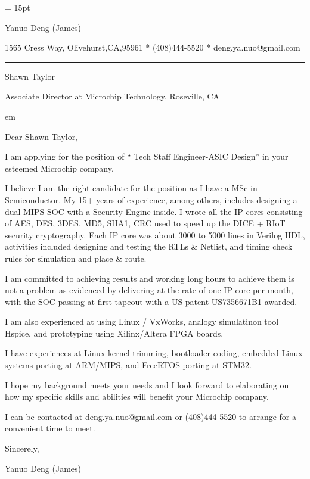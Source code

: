

  \FFrg \baselineskip = 15pt


{
Yanuo Deng (James)
}

{ 
1565 Cress Way, Olivehurst,CA,95961
*
(408)444-5520
*
deng.ya.nuo@gmail.com
}

{ \smallbreak } 
{\par\noindent\hrule} 
{ \medbreak } { 
}

%
%

{ \bigbreak } 


Shawn Taylor

Associate Director at Microchip Technology, Roseville, CA

 em

{ 
Dear Shawn Taylor,
}

{ \bigbreak } 
I am applying for the position of `` Tech Staff Engineer-ASIC Design'' in your esteemed Microchip company.

{ \bigbreak } 
I believe I am the right candidate for the position as I have a MSc in Semiconductor.
My 15+ years of experience, among others, 
includes designing a dual-MIPS SOC with a Security Engine inside. 
I wrote all the IP cores consisting of AES, DES, 3DES, MD5, SHA1, CRC 
used to speed up the DICE + RIoT security cryptography.
Each IP core was about 3000 to 5000 lines in Verilog HDL, 
activities included designing and testing the RTLs \& Netlist,
and timing check rules for simulation and place \& route.

{ \bigbreak } 
I am committed to achieving results and working long hours 
to achieve them is not a problem as evidenced by 
delivering at the rate of one IP core per month,
with the SOC passing at first tapeout
with a US patent US7356671B1 awarded.

{ \bigbreak } 
I am also experienced at using Linux / VxWorks, 
analogy simulatinon tool Hspice, 
and prototyping using Xilinx/Altera FPGA boards.

{ \bigbreak } 
I have experiences at Linux kernel trimming, bootloader coding, embedded Linux systems porting at ARM/MIPS, and FreeRTOS porting at STM32.

{ \bigbreak } 
I hope my background meets your needs and I look
forward to elaborating on how my specific skills and abilities will benefit your Microchip company.

{ \bigbreak } 
I can be contacted at deng.ya.nuo@gmail.com
or (408)444-5520 to arrange for a convenient time to meet.

{ \bigbreak } 




\vskip 60pt

{ \bigbreak } 
Sincerely,

Yanuo Deng (James)

\bye
